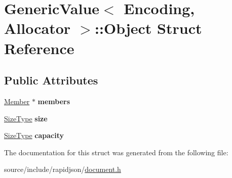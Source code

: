 \hypertarget{struct_generic_value_1_1_object}{}\section{Generic\+Value$<$ Encoding, Allocator $>$\+:\+:Object Struct Reference}
\label{struct_generic_value_1_1_object}
\subsection*{Public Attributes}
\begin{DoxyCompactItemize}
\item 
\hypertarget{struct_generic_value_1_1_object_ab51b8366577cb12f0280e4a6d7dab926}{}\hyperlink{class_generic_value_a7ccf27c44058b4c11c3efc6473afb886}{Member} $\ast$ {\bfseries members}\label{struct_generic_value_1_1_object_ab51b8366577cb12f0280e4a6d7dab926}

\item 
\hypertarget{struct_generic_value_1_1_object_a10da3d9035961100ed11f955a4afd2b6}{}\hyperlink{rapidjson_8h_a5ed6e6e67250fadbd041127e6386dcb5}{Size\+Type} {\bfseries size}\label{struct_generic_value_1_1_object_a10da3d9035961100ed11f955a4afd2b6}

\item 
\hypertarget{struct_generic_value_1_1_object_ab22a81c7ac57baf0d4ea343dfd6d8b33}{}\hyperlink{rapidjson_8h_a5ed6e6e67250fadbd041127e6386dcb5}{Size\+Type} {\bfseries capacity}\label{struct_generic_value_1_1_object_ab22a81c7ac57baf0d4ea343dfd6d8b33}

\end{DoxyCompactItemize}


The documentation for this struct was generated from the following file\+:\begin{DoxyCompactItemize}
\item 
source/include/rapidjson/\hyperlink{document_8h}{document.\+h}\end{DoxyCompactItemize}
